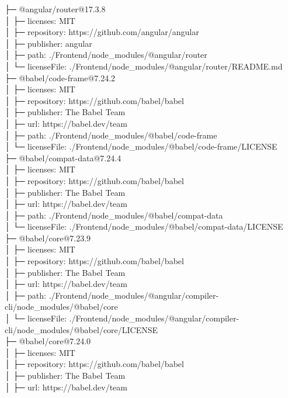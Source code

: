 ├─ @angular/router@17.3.8\\
│  ├─ licenses: MIT\\
│  ├─ repository: https://github.com/angular/angular\\
│  ├─ publisher: angular\\
│  ├─ path: ./Frontend/node\_modules/@angular/router\\
│  └─ licenseFile: ./Frontend/node\_modules/@angular/router/README.md\\
├─ @babel/code-frame@7.24.2\\
│  ├─ licenses: MIT\\
│  ├─ repository: https://github.com/babel/babel\\
│  ├─ publisher: The Babel Team\\
│  ├─ url: https://babel.dev/team\\
│  ├─ path: ./Frontend/node\_modules/@babel/code-frame\\
│  └─ licenseFile: ./Frontend/node\_modules/@babel/code-frame/LICENSE\\
├─ @babel/compat-data@7.24.4\\
│  ├─ licenses: MIT\\
│  ├─ repository: https://github.com/babel/babel\\
│  ├─ publisher: The Babel Team\\
│  ├─ url: https://babel.dev/team\\
│  ├─ path: ./Frontend/node\_modules/@babel/compat-data\\
│  └─ licenseFile: ./Frontend/node\_modules/@babel/compat-data/LICENSE\\
├─ @babel/core@7.23.9\\
│  ├─ licenses: MIT\\
│  ├─ repository: https://github.com/babel/babel\\
│  ├─ publisher: The Babel Team\\
│  ├─ url: https://babel.dev/team\\
│  ├─ path: ./Frontend/node\_modules/@angular/compiler-cli/node\_modules/@babel/core\\
│  └─ licenseFile: ./Frontend/node\_modules/@angular/compiler-cli/node\_modules/@babel/core/LICENSE\\
├─ @babel/core@7.24.0\\
│  ├─ licenses: MIT\\
│  ├─ repository: https://github.com/babel/babel\\
│  ├─ publisher: The Babel Team\\
│  ├─ url: https://babel.dev/team\\
